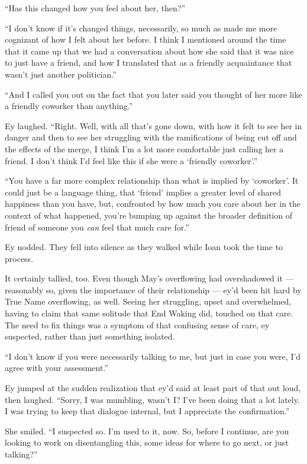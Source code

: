 ``Has this changed how you feel about her, then?''

``I don't know if it's changed things, necessarily, so much as made me more cognizant of how I felt about her before. I think I mentioned around the time that it came up that we had a conversation about how she said that it was nice to just have a friend, and how I translated that as a friendly acquaintance that wasn't just another politician.''

``And I called you out on the fact that you later said you thought of her more like a friendly coworker than anything.''

Ey laughed. ``Right. Well, with all that's gone down, with how it felt to see her in danger and then to see her struggling with the ramifications of being cut off and the effects of the merge, I think I'm a lot more comfortable just calling her a friend. I don't think I'd feel like this if she were a `friendly coworker'.''

``You have a far more complex relationship than what is implied by `coworker'. It could just be a language thing, that `friend' implies a greater level of shared happiness than you have, but, confronted by how much you care about her in the context of what happened, you're bumping up against the broader definition of friend of someone you \emph{can} feel that much care for.''

Ey nodded. They fell into silence as they walked while Ioan took the time to process.

It certainly tallied, too. Even though May's overflowing had overshadowed it — reasonably so, given the importance of their relationship — ey'd been hit hard by True Name overflowing, as well. Seeing her struggling, upset and overwhelmed, having to claim that same solitude that End Waking did, touched on that care. The need to fix things was a symptom of that confusing sense of care, ey suspected, rather than just something isolated.

``I don't know if you were necessarily talking to me, but just in case you were, I'd agree with your assessment.''

Ey jumped at the sudden realization that ey'd said at least part of that out loud, then laughed. ``Sorry, I was mumbling, wasn't I? I've been doing that a lot lately. I was trying to keep that dialogue internal, but I appreciate the confirmation.''

She smiled. ``I suspected so. I'm used to it, now. So, before I continue, are you looking to work on disentangling this, some ideas for where to go next, or just talking?''

